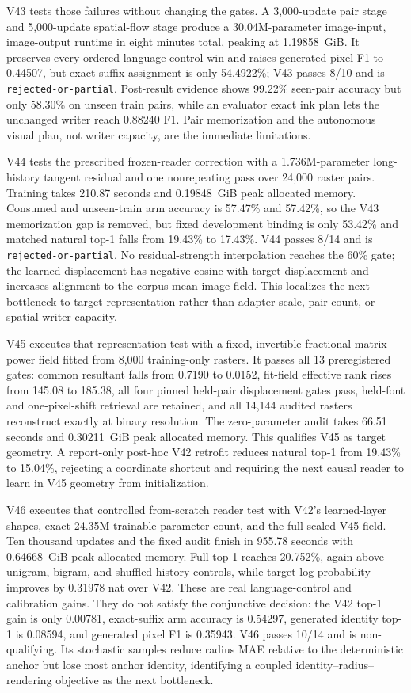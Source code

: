 \documentclass[11pt]{article}
\begin{document}
V43 tests those failures without changing the gates. A 3,000-update pair stage
and 5,000-update spatial-flow stage produce a 30.04M-parameter image-input,
image-output runtime in eight minutes total, peaking at 1.19858~GiB. It
preserves every ordered-language control win and raises generated pixel F1 to
0.44507, but exact-suffix assignment is only 54.4922\%; V43 passes 8/10 and is
\texttt{rejected-or-partial}. Post-result evidence shows 99.22\% seen-pair
accuracy but only 58.30\% on unseen train pairs, while an evaluator exact ink
plan lets the unchanged writer reach 0.88240 F1. Pair memorization and the
autonomous visual plan, not writer capacity, are the immediate limitations.

V44 tests the prescribed frozen-reader correction with a 1.736M-parameter
long-history tangent residual and one nonrepeating pass over 24,000 raster
pairs. Training takes 210.87 seconds and 0.19848~GiB peak allocated memory.
Consumed and unseen-train arm accuracy is 57.47\% and 57.42\%, so the V43
memorization gap is removed, but fixed development binding is only 53.42\% and
matched natural top-1 falls from 19.43\% to 17.43\%. V44 passes 8/14 and is
\texttt{rejected-or-partial}. No residual-strength interpolation reaches the
60\% gate; the learned displacement has negative cosine with target
displacement and increases alignment to the corpus-mean image field. This
localizes the next bottleneck to target representation rather than adapter
scale, pair count, or spatial-writer capacity.

V45 executes that representation test with a fixed, invertible fractional
matrix-power field fitted from 8,000 training-only rasters. It passes all 13
preregistered gates: common resultant falls from 0.7190 to 0.0152, fit-field
effective rank rises from 145.08 to 185.38, all four pinned held-pair
displacement gates pass, held-font and one-pixel-shift retrieval are retained,
and all 14,144 audited rasters reconstruct exactly at binary resolution. The
zero-parameter audit takes 66.51 seconds and 0.30211~GiB peak allocated memory.
This qualifies V45 as target geometry. A report-only post-hoc V42 retrofit
reduces natural top-1 from 19.43\% to 15.04\%, rejecting a coordinate shortcut
and requiring the next causal reader to learn in V45 geometry from
initialization.

V46 executes that controlled from-scratch reader test with V42's learned-layer
shapes, exact 24.35M trainable-parameter count, and the full scaled V45 field. Ten thousand updates and the
fixed audit finish in 955.78 seconds with 0.64668~GiB peak allocated memory.
Full top-1 reaches 20.752\%, again above unigram, bigram, and shuffled-history
controls, while target log probability improves by 0.31978 nat over V42. These
are real language-control and calibration gains. They do not satisfy the
conjunctive decision: the V42 top-1 gain is only 0.00781, exact-suffix arm
accuracy is 0.54297, generated identity top-1 is 0.08594, and generated pixel
F1 is 0.35943. V46 passes 10/14 and is non-qualifying. Its stochastic samples
reduce radius MAE relative to the deterministic anchor but lose most anchor
identity, identifying a coupled identity--radius--rendering objective as the
next bottleneck.
\end{document}
